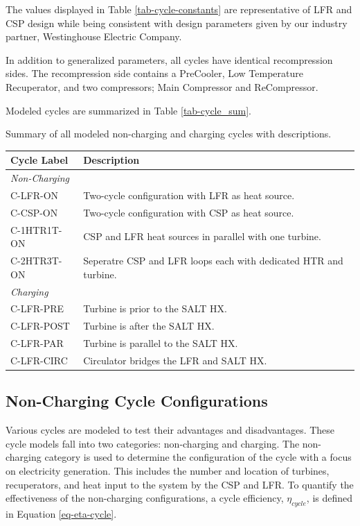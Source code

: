 \begin{paracol}{2}
The values displayed in Table \ref{tab-cycle-constants} are representative of LFR and CSP design while being consistent with design parameters given by our industry partner, Westinghouse Electric Company. 

In addition to generalized parameters, all cycles have identical recompression sides. The recompression side contains a PreCooler, Low Temperature Recuperator, and two compressors; Main Compressor and ReCompressor.

Modeled cycles are summarized in Table \ref{tab-cycle_sum}.

\begin{specialtable}[H] 
    \caption{Summary of all modeled non-charging and charging cycles with descriptions. \label{tab-cycle_sum}}
    \begin{tabular}{ll}
    \toprule
    \textbf{Cycle Label} & \textbf{Description}\\
    \midrule
    \textit{Non-Charging}\\
    C-LFR-ON & Two-cycle configuration with LFR as heat source.\\
    C-CSP-ON & Two-cycle configuration with CSP as heat source.\\
    C-1HTR1T-ON & CSP and LFR heat sources in parallel with one turbine.\\
    C-2HTR3T-ON & Seperatre CSP and LFR loops each with dedicated HTR and turbine.\\
    \midrule
    \textit{Charging}\\
    C-LFR-PRE & Turbine is prior to the SALT HX.\\
    C-LFR-POST & Turbine is after the SALT HX.\\
    C-LFR-PAR & Turbine is parallel to the SALT HX.\\
    C-LFR-CIRC & Circulator bridges the LFR and SALT HX.\\
    \bottomrule
    \end{tabular}
\end{specialtable}

\subsection{Non-Charging Cycle Configurations} 

Various cycles are modeled to test their advantages and disadvantages. These cycle models fall into two categories: non-charging and charging. The non-charging category is used to determine the configuration of the cycle with a focus on electricity generation. This includes the number and location of turbines, recuperators, and heat input to the system by the CSP and LFR. To quantify the effectiveness of the non-charging configurations, a cycle efficiency, $\eta_{cycle}$, is defined in Equation \ref{eq-eta-cycle}.


\end{paracol}
